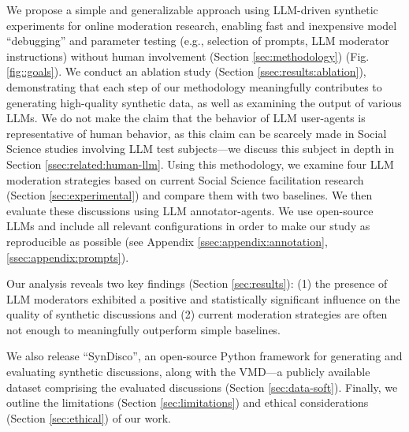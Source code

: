 We propose a simple and generalizable approach using \ac{LLM}-driven synthetic experiments for online moderation research, enabling fast and inexpensive model “debugging” and parameter testing (e.g., selection of prompts, \ac{LLM} moderator instructions) without human involvement (Section \ref{sec:methodology}) (Fig. \ref{fig::goals}). We conduct an ablation study (Section \ref{ssec:results:ablation}), demonstrating that each step of our methodology meaningfully contributes to generating high-quality synthetic data, as well as examining the output of various \acp{LLM}. We do not make the claim that the behavior of \ac{LLM} user-agents is representative of human behavior, as this claim can be scarcely made in Social Science studies involving \ac{LLM} test subjects—we discuss this subject in depth in Section \ref{ssec:related:human-llm}. Using this methodology, we examine four \ac{LLM} moderation strategies based on current Social Science facilitation research (Section \ref{sec:experimental})
and compare them with two baselines. We then evaluate these discussions using \ac{LLM} annotator-agents. We use open-source \acp{LLM} and include all relevant configurations in order to make our study as reproducible as possible (see Appendix \ref{ssec:appendix:annotation}, \ref{ssec:appendix:prompts}).


 Our analysis reveals two key findings (Section \ref{sec:results}): (1) the presence of \ac{LLM} moderators exhibited a positive and statistically significant influence on the quality of synthetic discussions and (2) current moderation strategies are often not enough to meaningfully outperform simple baselines. %

We also release “SynDisco”, an open-source Python framework for generating and evaluating synthetic discussions, along with the \acf{VMD}\datasetlink—a publicly available dataset comprising the evaluated discussions (Section \ref{sec:data-soft}). Finally, we outline the limitations (Section \ref{sec:limitations}) and ethical considerations (Section \ref{sec:ethical}) of our work.